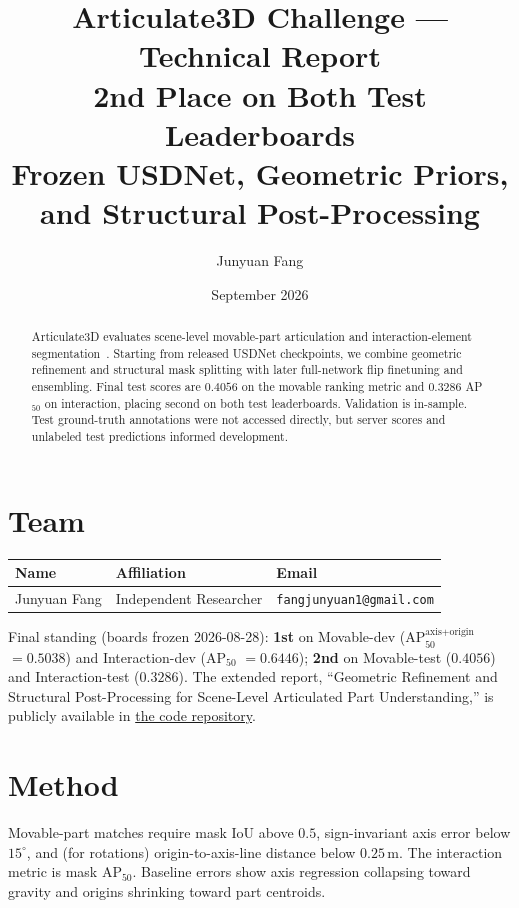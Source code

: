\documentclass[11pt]{article}
\title{\vspace{-8mm}Articulate3D Challenge --- Technical Report\\
\large 2nd Place on Both Test Leaderboards\\
\normalsize Frozen USDNet, Geometric Priors, and Structural Post-Processing}
\author{Junyuan Fang}
\date{September 2026}
\newcommand{\metric}{AP$_{50}^{\text{axis+origin}}$}
\newcommand{\apfifty}{AP$_{50}$}
\begin{document}
\maketitle
\vspace{-6mm}

\begin{abstract}
Articulate3D evaluates scene-level movable-part articulation and
interaction-element segmentation~\cite{halacheva2025articulate3d}. Starting
from released USDNet checkpoints, we combine geometric refinement and
structural mask splitting with later full-network flip finetuning and
ensembling. Final test scores are $0.4056$ on the movable ranking metric and
$0.3286$ AP$_{50}$ on interaction, placing second on both test leaderboards.
Validation is in-sample. Test ground-truth annotations were not accessed
directly, but server scores and unlabeled test predictions informed
development.
\end{abstract}

\section*{Team}
\begin{tabular}{@{}lll@{}}
\toprule
Name & Affiliation & Email \\
\midrule
Junyuan Fang & Independent Researcher & \texttt{fangjunyuan1@gmail.com} \\
\bottomrule
\end{tabular}

\smallskip
{\small
\noindent Final standing (boards frozen 2026-08-28): \textbf{1st} on Movable-dev (\metric{} $=0.5038$) and Interaction-dev (\apfifty{} $=0.6446$);
\textbf{2nd} on Movable-test ($0.4056$) and Interaction-test ($0.3286$).
The extended report, ``Geometric Refinement and Structural Post-Processing for Scene-Level Articulated Part Understanding,'' is publicly available in \href{https://github.com/junyuan-fang/articulate3d/blob/master/paper/main.pdf}{the code repository}.\par}

\section*{Method}

Movable-part matches require mask IoU above $0.5$, sign-invariant axis error below $15^\circ$, and (for rotations) origin-to-axis-line distance below $0.25$\,m. The interaction metric is mask AP$_{50}$. Baseline errors show axis regression collapsing toward gravity and origins shrinking toward part centroids.
\end{document}
